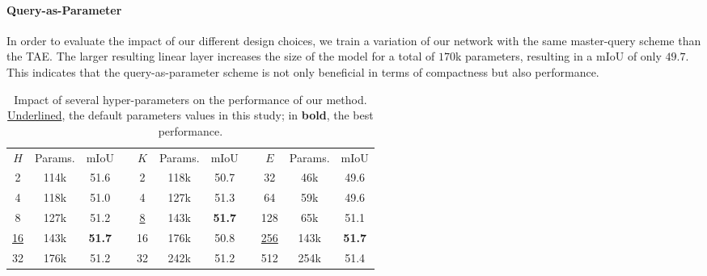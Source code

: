 \documentclass[runningheads]{llncs}
\begin{document}
\paragraph{Query-as-Parameter}
In order to evaluate the impact of our different design choices, we train a variation of our network with the same master-query scheme than the TAE. The larger resulting linear layer increases the size of the model for a total of $170$k parameters, resulting in a mIoU of only $49.7$. This indicates that the query-as-parameter scheme is not only beneficial in terms of compactness but also performance.
\begin{table}[h]
    \caption{Impact of several hyper-parameters on the performance of our method. \underline{Underlined}, the default parameters values in this study; in \textbf{bold}, the best performance.}
    \centering
    \begin{tabular}{ccccccccccc}
$H$ & Params.  & mIoU & \phantom{abc} & $K$ & Params.  & mIoU & \phantom{abc} &$E$ & Params.  & mIoU \\ \cmidrule{1-3} \cmidrule{5-7} \cmidrule{9-11}
     2  &  114k   &  51.6    &&      2   &     118k   &     50.7      &&  32    & 46k     &     49.6     \\
     4  &      118k   &  51.0  & & 4   &   127k     &     51.3      &&    64   &   59k   &      49.6     \\
      8&    127k  &    51.2  && \underline{8}  &   143k   &     \bf51.7     &&   128    &  65k  &      51.1     \\
    \underline{16} &    143k &   \bf51.7    && 16  &    176k    &    50.8       &&  \underline{256}     &   143k   &      \bf51.7     \\

      32 &   176k  &   51.2   &&       32  &     242k   &     51.2      &&   512    &   254k  &      51.4     \\\cmidrule{1-3} \cmidrule{5-7} \cmidrule{9-11}
    \end{tabular}
    \label{tab:ablations}
\end{table}
\end{document}
